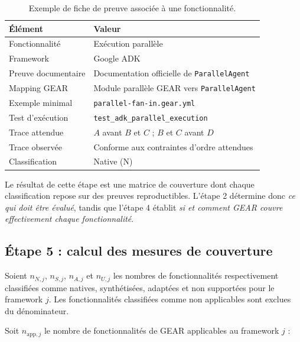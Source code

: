 \begin{table}[t]
    \centering
    \caption{Exemple de fiche de preuve associée à une fonctionnalité.}
    \label{tab:fiche-preuve}
    \begin{tabularx}{\textwidth}{@{}l>{\raggedright\arraybackslash}X@{}}
        \toprule
        \textbf{Élément} & \textbf{Valeur} \\
        \midrule
        Fonctionnalité
            & Exécution parallèle \\
        Framework
            & Google ADK \\
        Preuve documentaire
            & Documentation officielle de \texttt{ParallelAgent} \\
        Mapping GEAR
            & Module parallèle GEAR vers \texttt{ParallelAgent} \\
        Exemple minimal
            & \texttt{parallel-fan-in.gear.yml} \\
        Test d'exécution
            & \texttt{test\_adk\_parallel\_execution} \\
        Trace attendue
            & $A$ avant $B$ et $C$ ; $B$ et $C$ avant $D$ \\
        Trace observée
            & Conforme aux contraintes d'ordre attendues \\
        Classification
            & Native (N) \\
        \bottomrule
    \end{tabularx}
\end{table}

Le résultat de cette étape est une matrice de couverture dont chaque
classification repose sur des preuves reproductibles. L'étape 2
détermine donc \emph{ce qui doit être évalué}, tandis que l'étape 4
établit \emph{si et comment GEAR couvre effectivement chaque
fonctionnalité}.
\subsection{Étape 5 : calcul des mesures de couverture}
\label{subsec:mesures-couverture}

Soient $n_{N,j}$, $n_{S,j}$, $n_{A,j}$ et $n_{U,j}$ les nombres de
fonctionnalités respectivement classifiées comme natives, synthétisées,
adaptées et non supportées pour le framework $j$. Les fonctionnalités
classifiées comme non applicables sont exclues du dénominateur.

Soit $n_{\mathrm{app},j}$ le nombre de fonctionnalités de GEAR
applicables au framework $j$ :

